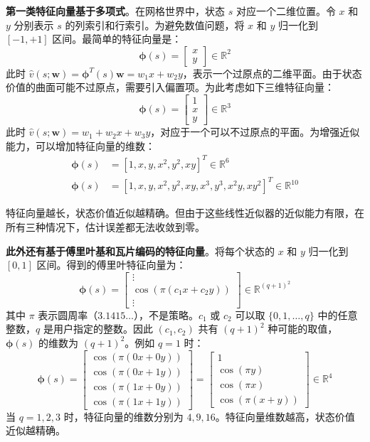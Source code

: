 \documentclass[UTF8]{article}
\begin{document}
\textbf{第一类特征向量基于多项式}。在网格世界中，状态 $s$ 对应一个二维位置。令 $x$ 和 $y$ 分别表示 $s$ 的列索引和行索引。为避免数值问题，将 $x$ 和 $y$ 归一化到 $[-1, +1]$ 区间。最简单的特征向量是：
\[
\boldsymbol{\phi}(s) = \begin{bmatrix} x \\ y \end{bmatrix} \in \mathbb{R}^2
\]
此时 $\hat{v}(s; \boldsymbol{w}) = \boldsymbol{\phi}^T(s)\boldsymbol{w} = w_1 x + w_2 y$，表示一个过原点的二维平面。由于状态价值的曲面可能不过原点，需要引入偏置项。为此考虑如下三维特征向量：
\begin{equation}
\label{eq:phi3}
\boldsymbol{\phi}(s) = \begin{bmatrix} 1 \\ x \\ y \end{bmatrix} \in \mathbb{R}^3
\end{equation}
此时 $\hat{v}(s; \boldsymbol{w}) = w_1 + w_2 x + w_3 y$，对应于一个可以不过原点的平面。为增强近似能力，可以增加特征向量的维数：
\begin{align}
\boldsymbol{\phi}(s) &= [1, x, y, x^2, y^2, xy]^T \in \mathbb{R}^6 \label{eq:phi6} \\
\boldsymbol{\phi}(s) &= [1, x, y, x^2, y^2, xy, x^3, y^3, x^2 y, x y^2]^T \in \mathbb{R}^{10} \label{eq:phi10}
\end{align}

特征向量越长，状态价值近似越精确。但由于这些线性近似器的近似能力有限，在所有三种情况下，估计误差都无法收敛到零。

\textbf{此外还有基于傅里叶基和瓦片编码的特征向量}。将每个状态的 $x$ 和 $y$ 归一化到 $[0, 1]$ 区间。得到的傅里叶特征向量为：
\[
\boldsymbol{\phi}(s) = \begin{bmatrix}
    \vdots \\
    \cos(\pi(c_1 x + c_2 y)) \\
    \vdots
\end{bmatrix} \in \mathbb{R}^{(q+1)^2}
\]
其中 $\pi$ 表示圆周率（$3.1415\dots$），不是策略。$c_1$ 或 $c_2$ 可以取 $\{0, 1, \dots, q\}$ 中的任意整数，$q$ 是用户指定的整数。因此 $(c_1, c_2)$ 共有 $(q+1)^2$ 种可能的取值，$\boldsymbol{\phi}(s)$ 的维数为 $(q+1)^2$。例如 $q=1$ 时：
\[
\boldsymbol{\phi}(s) = \begin{bmatrix}
    \cos(\pi(0x + 0y)) \\
    \cos(\pi(0x + 1y)) \\
    \cos(\pi(1x + 0y)) \\
    \cos(\pi(1x + 1y))
\end{bmatrix} = \begin{bmatrix}
    1 \\ \cos(\pi y) \\ \cos(\pi x) \\ \cos(\pi(x+y))
\end{bmatrix} \in \mathbb{R}^4
\]
当 $q = 1, 2, 3$ 时，特征向量的维数分别为 $4, 9, 16$。特征向量维数越高，状态价值近似越精确。
\end{document}
